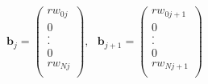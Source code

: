 \begin{equation}
    \mathbf{b}_j=\left(\begin{array}{c}
rw_{0j}\\
0\\
.\\
.\\
0\\
rw_{Nj}\\
\end{array}\right), \ \ \     
\mathbf{b}_{j+1}=\left(\begin{array}{c}
rw_{0j+1}\\
0\\
.\\
.\\
0\\
rw_{Nj+1}\\
\end{array}\right)
\end{equation}

